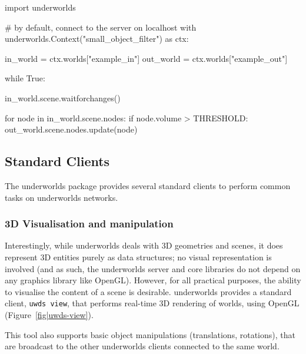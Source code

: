 \documentclass[letterpaper, 10pt, conference]{ieeeconf}
\newcommand{\uwds}{{\sc underworlds}\xspace}
\begin{document}
\begin{listing}[h!]

\begin{pythoncode}
import underworlds

# by default, connect to the server on localhost
with underworlds.Context("small_object_filter") as ctx:

    in_world = ctx.worlds["example_in"]
    out_world = ctx.worlds["example_out"]

    while True:

        in_world.scene.waitforchanges()

        for node in in_world.scene.nodes:
            if node.volume > THRESHOLD:
                out_world.scene.nodes.update(node)


\end{pythoncode}
    \caption{Example of a simple yet complete \uwds filter, written in Python:
    the client connects to the \uwds network, blocks until the world {\tt
    example\_in} changes, and only propagate nodes that match the condition to
    the world {\tt example\_out}.}

    \label{lst|pythonapi}
\end{listing}

\subsection{Standard Clients}
\label{std_clients}

The \uwds package provides several standard clients to perform common tasks on
\uwds networks.

\subsubsection{3D Visualisation and manipulation}

Interestingly, while \uwds deals with 3D geometries and scenes, it does
represent 3D entities purely as data structures; no visual representation is
involved (and as such, the \uwds server and core libraries do not depend on any
graphics library like OpenGL). However, for all practical purposes, the ability
to visualise the content of a scene is desirable. \uwds provides a standard
client, {\tt uwds view}, that performs real-time 3D rendering of worlds,
using OpenGL (Figure~\ref{fig|uwds-view}).

This tool also supports basic object manipulations (translations, rotations),
that are broadcast to the other \uwds clients connected to the same world.
\end{document}
